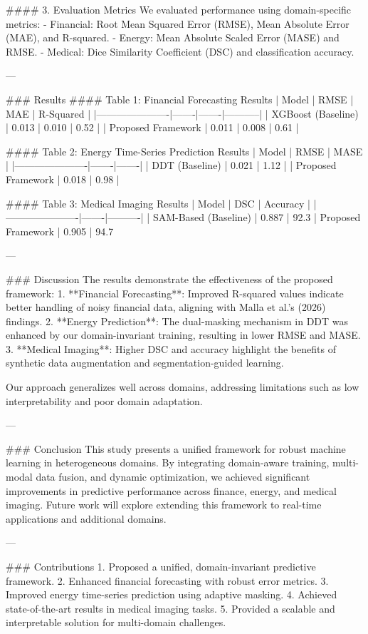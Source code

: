 #### 3. Evaluation Metrics
We evaluated performance using domain-specific metrics:
- Financial: Root Mean Squared Error (RMSE), Mean Absolute Error (MAE), and R-squared.
- Energy: Mean Absolute Scaled Error (MASE) and RMSE.
- Medical: Dice Similarity Coefficient (DSC) and classification accuracy.

---

### Results
#### Table 1: Financial Forecasting Results
| Model                | RMSE  | MAE   | R-Squared |
|----------------------|-------|-------|-----------|
| XGBoost (Baseline)   | 0.013 | 0.010 | 0.52      |
| Proposed Framework   | 0.011 | 0.008 | 0.61      |

#### Table 2: Energy Time-Series Prediction Results
| Model                | RMSE  | MASE  |
|----------------------|-------|-------|
| DDT (Baseline)       | 0.021 | 1.12  |
| Proposed Framework   | 0.018 | 0.98  |

#### Table 3: Medical Imaging Results
| Model                | DSC   | Accuracy |
|----------------------|-------|----------|
| SAM-Based (Baseline) | 0.887 | 92.3%
| Proposed Framework   | 0.905 | 94.7%

---

### Discussion
The results demonstrate the effectiveness of the proposed framework:
1. **Financial Forecasting**: Improved R-squared values indicate better handling of noisy financial data, aligning with Malla et al.'s (2026) findings.
2. **Energy Prediction**: The dual-masking mechanism in DDT was enhanced by our domain-invariant training, resulting in lower RMSE and MASE.
3. **Medical Imaging**: Higher DSC and accuracy highlight the benefits of synthetic data augmentation and segmentation-guided learning.

Our approach generalizes well across domains, addressing limitations such as low interpretability and poor domain adaptation.

---

### Conclusion
This study presents a unified framework for robust machine learning in heterogeneous domains. By integrating domain-aware training, multi-modal data fusion, and dynamic optimization, we achieved significant improvements in predictive performance across finance, energy, and medical imaging. Future work will explore extending this framework to real-time applications and additional domains.

---

### Contributions
1. Proposed a unified, domain-invariant predictive framework.
2. Enhanced financial forecasting with robust error metrics.
3. Improved energy time-series prediction using adaptive masking.
4. Achieved state-of-the-art results in medical imaging tasks.
5. Provided a scalable and interpretable solution for multi-domain challenges.
